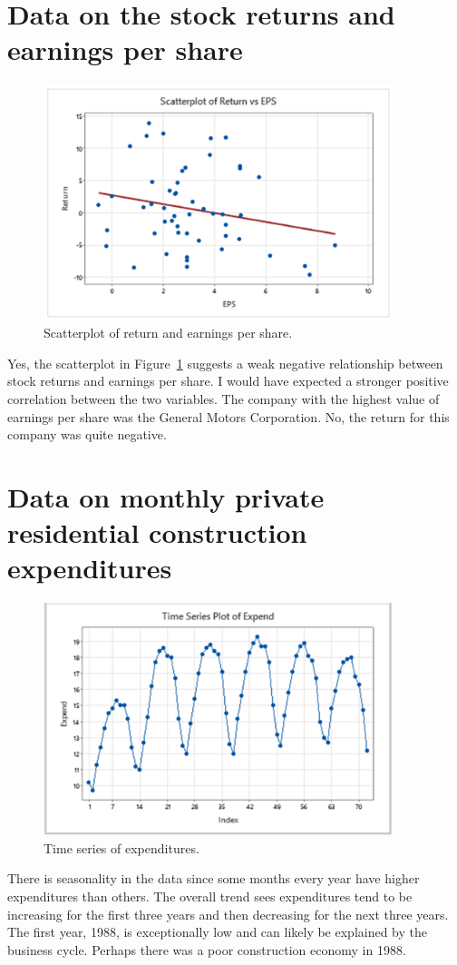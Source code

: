 \documentclass[12pt]{article}
\begin{document}
\section{Data on the stock returns and earnings per share}
\begin{figure}
\begin{center}
\includegraphics[width=4in]{images/return-eps-scatterplot.png}
\end{center}
\caption{Scatterplot of return and earnings per share.\label{fig:returnepsscatterplot}}
\end{figure}
Yes, the scatterplot in Figure~\ref{fig:returnepsscatterplot} suggests a weak negative relationship between stock returns and earnings per share. I would have expected a stronger positive correlation between the two variables. The company with the highest value of earnings per share was the General Motors Corporation. No, the return for this company was quite negative. 

\section{Data on monthly private residential construction expenditures}
\begin{figure}
\begin{center}
\includegraphics[width=4in]{images/expenditures-time-series.png}
\end{center}
\caption{Time series of expenditures.}
\end{figure}
There is seasonality in the data since some months every year have higher expenditures than others. The overall trend sees expenditures tend to be increasing for the first three years and then decreasing for the next three years. The first year, 1988, is exceptionally low and can likely be explained by the business cycle. Perhaps there was a poor construction economy in 1988. 
\end{document}
